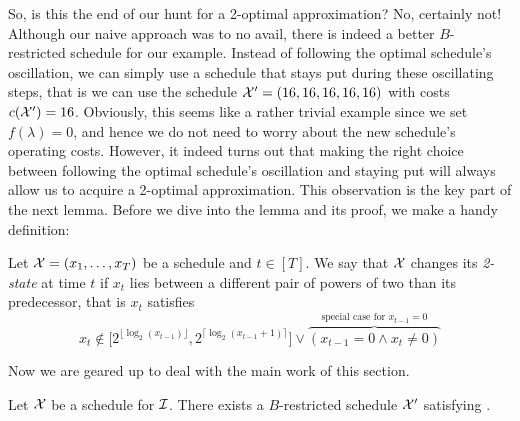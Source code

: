 So, is this the end of our hunt for a 2-optimal approximation? No, certainly not! Although our naive approach was to no avail, there is indeed a better $B$-restricted schedule for our example. Instead of following the optimal schedule's oscillation, we can simply use a schedule that stays put during these oscillating steps, that is we can use the schedule $\mathcal{X}'=(16,16,16,16,16)$ with costs $c(\mathcal{X}')=16$. Obviously, this seems like a rather trivial example since we set $f(\lambda)=0$, and hence we do not need to worry about the new schedule's operating costs. However, it indeed turns out that making the right choice between following the optimal schedule's oscillation and staying put will always allow us to acquire a 2-optimal approximation. This observation is the key part of the next lemma. Before we dive into the lemma and its proof, we make a handy definition:
\begin{defn}
Let $\mathcal{X}=(x_1,\dotsc,x_T)$ be a schedule and $t\in[T]$. We say that $\mathcal{X}$ changes its \emph{2-state} at time $t$ if $x_t$ lies between a different pair of powers of two than its predecessor, that is $x_t$ satisfies
\begin{equation*}
	x_t\notin\bigl[2^{\lfloor \log_2(x_{t-1})\rfloor},2^{\lceil \log_2(x_{t-1}+1)\rceil}\bigr] \lor\overbrace{(x_{t-1}=0\land x_t\neq 0)}^{\text{special case for }x_{t-1}=0}
\end{equation*}
\end{defn}
Now we are geared up to deal with the main work of this section.
\begin{lem}\label{lem:transform_schedule_approx_2}
Let $\mathcal{X}$ be a schedule for $\mathcal{I}$. There exists a $B$-restricted schedule $\mathcal{X}'$ satisfying .
\end{lem}
